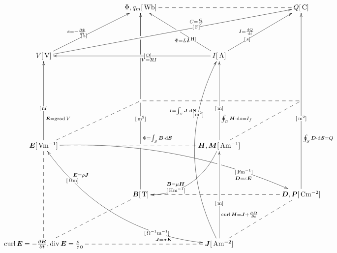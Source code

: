 \documentclass[a4j,8pt]{jarticle}
\makeatletter
\def\uni#1{[\unit{#1}]}
\def\cell#1#2{#1\uni{#2}}
\def\dottedhole#1{\ar@{--}[#1]|!{[ld];[lu]}\hole}
\def\dotted#1{\ar@{--}[#1]}
\def\arrow#1#2#3{\ar[#1]|-(.4){\uni{#2}}_(.3){#3}}
\def\arroww#1#2#3{\ar[#1]|-(.3){\uni{#2}}^(.4){#3}|!{[ll];[ru]}\hole}
\def\arrowu#1#2#3{\ar[#1]|-(.4){\uni{#2}}^(.4){#3}}
\def\arrowx#1#2#3{\ar[#1]|-(.6){\uni{#2}}^(.6){#3}}
\def\arrowy#1#2#3{\ar@/^3pc/[#1]|-(.7){\uni{#2}}^(.7){#3}}
\def\arrowyy#1#2#3#4#5{\ar@/_3pc/@{<->}[#1]|-(0.2){\uni{#4}}^(0.2){#5}|-(.75){\uni{#2}}_(.75){#3}}
\def\arrowz#1#2#3{\ar@/^2pc/[#1]|-(.7){\uni{#2}}_(.6){#3}}
\def\arrowzz#1#2#3{\ar@/^2pc/[#1] |!{[rr];[rrdd]}\hole |-(.8){\uni{#2}}_(.8){#3\quad}}
\def\arrowp#1#2#3{\ar@{->}[#1] _(.3){#3} |!{[u];[u]}\hole |-(0.4){\uni{#2}} |!{[uu];[uu]}\hole |!{[uuu];[uuu]}\hole |!{[luuu];[ruuuru]}\hole} %
\makeatother
\begin{document}
\[\xymatrix@=0.75in{
                                                                                                                                                                                             & \cell{\Phi, q_m}{Wb}\dotted{rr}\ar @{-}[d]|!{[ld];[rr]}\hole     &                                                                                                                                        & \cell{Q}{C}\\
 \cell V V\arrowu{ur}{s}{e=-\fracpd\Phi t}\arrowx{rrru}{F}{C=\frac Q V}                                                                                                                      &                                                                  & \cell I A\arrowu{ll}{O}{V=RI}\arroww{ur}{s}{I=\diff Q t}\arroww{lu}{H}{\Phi=LI}                                                        & \\
                                                                                                                                                                                             &                                                                  &                                                                                                                                        & \dottedhole{ll}\dotted{ld}\\
 \cell{\bm E}{Vm^{-1}}\arrow{uu}{m}{\bm E=\grad V}\dotted{rr}\dotted{ru}\arrowzz{rrrd}{Fm^{-1}}{\bm D=\varepsilon\bm E}\arrowyy{rrdd}{O^{-1}m^{-1}}{\bm J=\sigma\bm E}{Om}{\bm E=\rho\bm J } &                                                                  & \cell{\bm H,\bm M}{Am^{-1}}\arrow{uu}{m}{\oint_C\bm H\cdot\dd s=I_f}\arrowz{dl}{Hm^{-1}}{\bm B=\mu\bm H}                               & \\
                                                                                                                                                                                             & \cell{\bm B}{T}\arrowp{uuuu}{m^2}{\Phi=\int_S\bm B\cdot\dd\bm S} &                                                                                                                                        & \cell{\bm D,\bm P}{Cm^{-2}}\arrow{uuuu}{m^2}{\oint_S\bm D\cdot\dd\bm{S}=Q}\dottedhole{ll}\dotted{ld}\\
 {{\curl\bm E=-\frac{\partial\bm B}{\partial t}} ,{\diver\bm E=\frac\rho\varepsilon_0}}\dotted{uu}\dotted{rr}\dotted{ru}                                                                     &                                                                  & \cell{\bm J}{Am^{-2}}\arrow{uu}{m}{\curl\bm H=\bm J +\frac{\partial\bm D}{\partial t}}\arrowy{uuuu}{m^2}{I=\int_S\bm J\cdot\dd\bm S}\\
}\]
\end{document}
